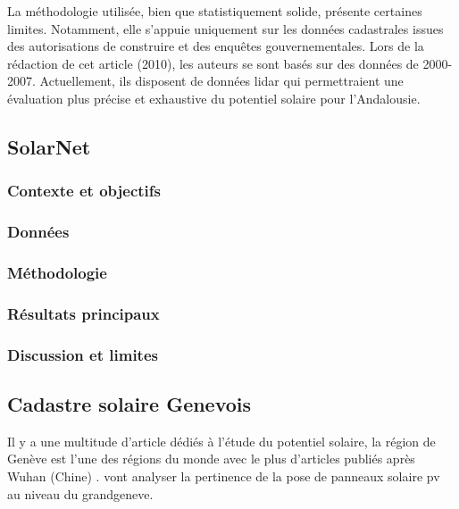 \par{La méthodologie utilisée, bien que statistiquement solide, présente certaines limites. Notamment, elle s'appuie uniquement sur les données cadastrales issues des autorisations de construire et des enquêtes gouvernementales. Lors de la rédaction de cet article (2010), les auteurs se sont basés sur des données de 2000-2007. Actuellement, ils disposent de données \gls{lidar} \cite{nacional_plan_nodate} qui permettraient une évaluation plus précise et exhaustive du potentiel solaire pour l'Andalousie.}

\subsection{SolarNet}

\par{}

\subsubsection{Contexte et objectifs}

\subsubsection{Données}

\subsubsection{Méthodologie}

\subsubsection{Résultats principaux}

\subsubsection{Discussion et limites}

\subsection{Cadastre solaire Genevois}

\par{Il y a une multitude d'article dédiés à l'étude du potentiel solaire, la région de Genève est l'une des régions du monde avec le plus d'articles publiés après Wuhan (Chine) \cite{drozd_evaluating_2025}. \citeauthor{thebault_large-scale_2022} \cite{thebault_large-scale_2022} vont analyser la pertinence de la pose de panneaux solaire \acrshort{pv} au niveau du \gls{grandgeneve}.}

